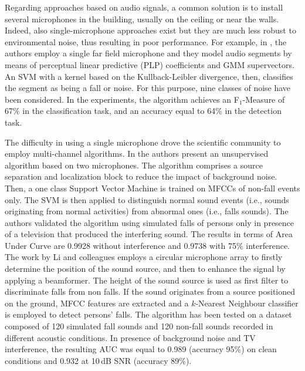 Regarding approaches based on audio signals, a common solution is to install several microphones in the building, usually on the ceiling or near the walls. Indeed, also single-microphone approaches exist but they are much less robust to environmental noise, thus resulting in poor performance. For example, in \cite{zhuang2009acoustic}, the authors employ a single far field microphone and they model audio segments by means of perceptual linear predictive (PLP) coefficients and GMM supervectors. An SVM with a kernel based on the Kullback-Leibler divergence, then, classifies the segment as being a fall or noise. For this purpose, nine classes of noise have been considered. In the experiments, the algorithm achieves an F$_1$-Measure of 67\% in the classification task, and an accuracy equal to 64\% in the detection task. 

The difficulty in using a single microphone drove the scientific community to employ multi-channel algorithms. In \cite{khan2015unsupervised} the authors present an unsupervised algorithm based on two microphones. The algorithm comprises a source separation and localization block to reduce the impact of background noise. Then, a one class Support Vector Machine is trained on MFCCs of non-fall events only. The SVM is then applied to distinguish normal sound events (i.e., sounds originating from normal activities) from abnormal ones (i.e., falls sounds). The authors validated the algorithm using simulated falls of persons only in presence of a television that produced the interfering sound. The results in terms of Area Under Curve are 0.9928 without interference and 0.9738 with 75\% interference. The work by Li and colleagues \cite{li2012microphone} employs a circular microphone array to firstly determine the position of the sound source, and then to enhance the signal by applying a beamformer. The height of the sound source is used as first filter to discriminate falls from non falls. If the sound originates from a source positioned on the ground, MFCC features are extracted and a $k$-Nearest Neighbour classifier is employed to detect persons' falls. The algorithm has been tested on a dataset composed of 120 simulated fall sounds and 120 non-fall sounds recorded in different acoustic conditions. In presence of background noise and TV interference, the resulting AUC was equal to 0.989 (accuracy 95\%) on clean conditions and 0.932 at 10\,dB SNR (accuracy 89\%). 

